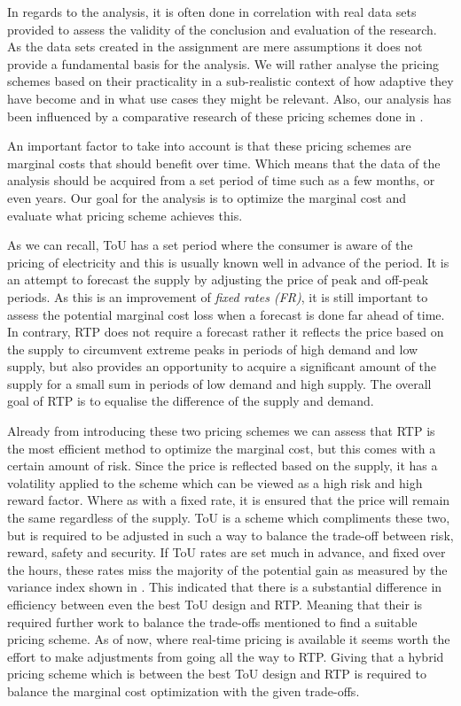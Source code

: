 \documentclass{article}
\begin{document}
        In regards to the analysis, it is often done in correlation with real data sets provided to assess the validity of the conclusion and evaluation of the research. As the data sets created in the assignment are mere assumptions it does not provide a fundamental basis for the analysis. We will rather analyse the pricing schemes based on their practicality in a sub-realistic context of how adaptive they have become and in what use cases they might be relevant. Also, our analysis has been influenced by a comparative research of these pricing schemes done in \cite{RTPvsToU}.


        An important factor to take into account is that these pricing schemes are marginal costs that should benefit over time. Which means that the data of the analysis should be acquired from a set period of time such as a few months, or even years. Our goal for the analysis is to optimize the marginal cost and evaluate what pricing scheme achieves this.

        As we can recall, ToU has a set period where the consumer is aware of the pricing of electricity and this is usually known well in advance of the period. It is an attempt to forecast the supply by adjusting the price of peak and off-peak periods. As this is an improvement of \emph{fixed rates (FR)}, it is still important to assess the potential marginal cost loss when a forecast is done far ahead of time. In contrary, RTP does not require a forecast rather  it reflects the price based on the supply to circumvent extreme peaks in periods of high demand and low supply, but also provides an opportunity to acquire a significant amount of the supply for a small sum in periods of low demand and high supply. The overall goal of RTP is to equalise the difference of the supply and demand.

        Already from introducing these two pricing schemes we can assess that RTP is the most efficient method to optimize the marginal cost, but this comes with a certain amount of risk. Since the price is reflected based on the supply, it has a volatility applied to the scheme which can be viewed as a high risk and high reward factor. Where as with a fixed rate, it is ensured that the price will remain the same regardless of the supply. ToU is a scheme which compliments these two, but is required to be adjusted in such a way to balance the trade-off between risk, reward, safety and security. If ToU rates are set much in advance, and fixed over the hours, these rates miss the majority of the potential gain as measured by the variance index shown in \cite{RTPvsToU}. This indicated that there is a substantial difference in efficiency between even the best ToU design and RTP. Meaning that their is required further work to balance the trade-offs mentioned to find a suitable pricing scheme. As of now, where real-time pricing is available it seems worth the effort to make adjustments from going all the way to RTP. Giving that a hybrid pricing scheme which is between the best ToU design and RTP is required to balance the marginal cost optimization with the given trade-offs.

    \printbibliography[heading=bibintoc]
\end{document}
